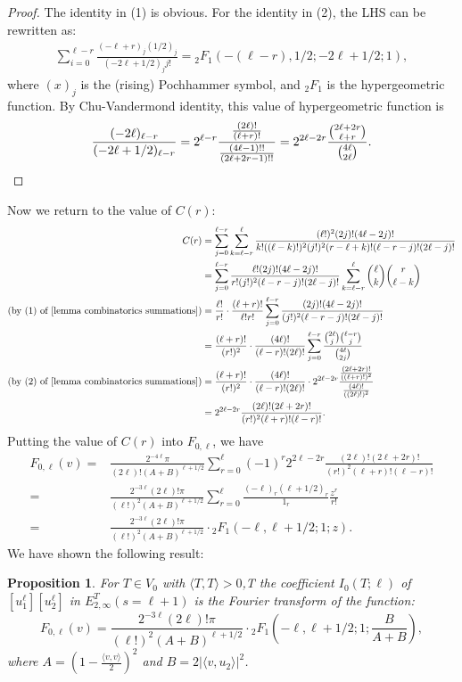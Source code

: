 \documentclass[12pt]{article}
\newtheorem{prop}[thm]{Proposition}
\theoremstyle{remark}
\theoremstyle{definition}
\newcommand{\lrangle}[2]{\langle #1,#2\rangle}
\begin{document}
\begin{proof}
    The identity in (1) is obvious.
    For the identity in (2),
    the LHS can be rewritten as:
    \begin{align*}
        \sum_{i=0}^{\ell-r}\frac{(-\ell+r)_{j}(1/2)_{j}}{(-2\ell+1/2)_{j}j!}={_{2}F_{1}}(-(\ell-r),1/2;-2\ell+1/2;1),
    \end{align*}
    where $(x)_{j}$ is the (rising) Pochhammer symbol,
    and $_{2}F_{1}$ is the hypergeometric function.
    By Chu-Vandermond identity,
    this value of hypergeometric function is
    \[\frac{(-2\ell)_{\ell-r}}{(-2\ell+1/2)_{\ell-r}}=2^{\ell-r}\frac{\frac{(2\ell)!}{(\ell+r)!}}{\frac{(4\ell-1)!!}{(2\ell+2r-1)!!}}=2^{2\ell-2r}\frac{\binom{2\ell+2r}{\ell+r}}{\binom{4\ell}{2\ell}}.\qedhere\]
\end{proof}
Now we return to the value of $C(r)$:
\begin{align*}
    C(r)&=\sum_{j=0}^{\ell-r}\sum_{k=\ell-r}^{\ell}\frac{(\ell!)^{2}(2j)!(4\ell-2j)!}{k!((\ell-k)!)^{2}(j!)^{2}(r-\ell+k)!(\ell-r-j)!(2\ell-j)!}\\
    &=\sum_{j=0}^{\ell-r}\frac{\ell!(2j)!(4\ell-2j)!}{r!(j!)^{2}(\ell-r-j)!(2\ell-j)!}\sum_{k=\ell-r}^{\ell}\binom{\ell}{k}\binom{r}{\ell-k}\\
    (\text{by (1) of \Cref{lemma combinatorics summations}})&=\frac{\ell!}{r!}\cdot\frac{(\ell+r)!}{\ell!r!}\sum_{j=0}^{\ell-r}\frac{(2j)!(4\ell-2j)!}{(j!)^{2}(\ell-r-j)!(2\ell-j)!}\\
    &=\frac{(\ell+r)!}{(r!)^{2}}\cdot \frac{(4\ell)!}{(\ell-r)!(2\ell)!}\sum_{j=0}^{\ell-r}\frac{\binom{2\ell}{j}\binom{\ell-r}{j}}{\binom{4\ell}{2j}}\\
    (\text{by (2) of \Cref{lemma combinatorics summations}})&=\frac{(\ell+r)!}{(r!)^{2}}\cdot\frac{(4\ell)!}{(\ell-r)!(2\ell)!}\cdot 2^{2\ell-2r}\frac{\frac{(2\ell+2r)!}{((\ell+r)!)^{2}}}{\frac{(4\ell)!}{((2\ell)!)^{2}}}\\
    &=2^{2\ell-2r}\frac{(2\ell)!(2\ell+2r)!}{(r!)^{2}(\ell+r)!(\ell-r)!}.
\end{align*}
Putting the value of $C(r)$ into $F_{0,\ell}$,
we have 
\begin{align*}
    F_{0,\ell}(v)=&\frac{2^{-4\ell}\pi}{(2\ell)!(A+B)^{\ell+1/2}}\sum_{r=0}^{\ell}(-1)^{r}2^{2\ell-2r}\frac{(2\ell)!(2\ell+2r)!}{(r!)^{2}(\ell+r)!(\ell-r)!}\\
    =&\frac{2^{-3\ell}(2\ell)!\pi}{(\ell!)^{2}(A+B)^{\ell+1/2}}\sum_{r=0}^{\ell}\frac{(-\ell)_{r}(\ell+1/2)_{r}}{1_{r}}\frac{z^{r}}{r!}\\
    =&\frac{2^{-3\ell}(2\ell)!\pi}{(\ell!)^{2}(A+B)^{\ell+1/2}}\cdot {_{2}F_{1}}(-\ell,\ell+1/2;1;z).
\end{align*}
We have shown the following result:
\begin{prop}\label{prop archimedean rank 2 Fourier}
    For $T\in V_{0}$ with $\lrangle{T}{T}>0$,T
    the coefficient $I_{0}(T;\ell)$ of $[u_{1}^{\ell}][u_{2}^{\ell}]$ in $E_{2,\infty}^{T}(s=\ell+1)$ is the Fourier transform of the function:
    \[F_{0,\ell}(v)=\frac{2^{-3\ell}(2\ell)!\pi}{(\ell!)^{2}(A+B)^{\ell+1/2}}\cdot {_{2}F_{1}}(-\ell,\ell+1/2;1;\frac{B}{A+B}),\]
    where $A=\left(1-\frac{\lrangle{v}{v}}{2}\right)^{2}$ and $B=2|\lrangle{v}{u_{2}}|^{2}$.
\end{prop}
\end{document}
